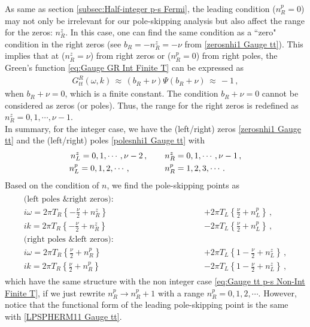 \documentclass[11pt,a4paper]{article}
\newcommand{\ra}{\rightarrow}
\begin{document}
As same as section \ref{subsec:Half-integer p-s Fermi}, the leading condition ($n_R^p=0$) may not only be irrelevant for our pole-skipping analysis but also affect the range for the zeros: $n_R^z$.
In this case, one can find the same condition as a ``zero" condition in the right zeros
(see $b_R=-n_R^z=-\nu$ from \eqref{zerosnhi1 Gauge tt}).
This implies that at ($n_R^z=\nu$) from right zeros or ($n_R^p=0$) from right poles, the Green's function \eqref{eq:Gauge GR Int Finite T} can be expressed as
\begin{equation} \label{DSRBE33 Gauge tt}
\begin{split}
{G}^R_{tt} (\omega, k)  \,\approx\, \left(b_{R}+\nu\right) \Psi\left({b}_R+\nu\right) \,\approx\, -1 \,,
\end{split}
\end{equation}
when $b_R + \nu=0$, which is a finite constant. The condition $b_R + \nu=0$ cannot be considered as zeros (or poles). Thus, the range for the right zeros is redefined as $n^z_R=0,1,\cdots, \nu-1$.\\

In summary, for the integer case, we have the (left/right) zeros \eqref{zerosnhi1 Gauge tt} and the (left/right) poles \eqref{polesnhi1 Gauge tt} with 
\begin{align}\label{HICRANGE Vector tt}
\begin{split}
n^z_L = 0,1,\cdots, \nu-2 \,,  \qquad \, & n^z_R = 0,1,\cdots, \nu-1 \,,\\
n^p_L = 0,1,2,\cdots \,, \hspace{0.8cm} \qquad
& n^p_R = 1,2,3,\cdots \,.
\end{split}
\end{align}
Based on the condition of $n$, we find the pole-skipping points as\\
\begin{align}\label{eq:Gauge tt p-s Int Finite T}
\begin{split}
\text{(left poles \& right zeros):} \qquad\qquad\qquad\qquad\qquad \\
i \omega = 2 \pi T_R \left\{ -\frac{\nu}{2} + n^z_R \right\} & + 2 \pi T_L \left\{ \frac{\nu}{2} + n^p_L \right\}\,,\\
i k = 2 \pi T_R \left\{ -\frac{\nu}{2} + n^z_R \right\} & - 2 \pi T_L \left\{ \frac{\nu}{2} + n^p_L \right\}\,,\\
\text{(right poles \& left zeros):} \qquad\qquad\qquad\qquad\qquad \\
i \omega = 2 \pi T_R \left\{ \frac{\nu}{2} +n^p_R \right\} & + 2 \pi T_L \left\{ 1-\frac{\nu}{2} + n^z_L \right\}\,,\\
i k = 2 \pi T_R \left\{ \frac{\nu}{2} + n^p_R \right\} & - 2 \pi T_L \left\{ 1-\frac{\nu}{2} + n^z_L \right\}\,,
\end{split}
\end{align}
which have the same structure with the non integer case \eqref{eq:Gauge tt p-s Non-Int Finite T}, if we just rewrite $n^p_R \ra n^p_R + 1$ with a range $n^p_R=0,1,2,\cdots$. However, notice that the functional form of the leading pole-skipping point is the same with \eqref{LPSPHERM11 Gauge tt}.\\
\end{document}
